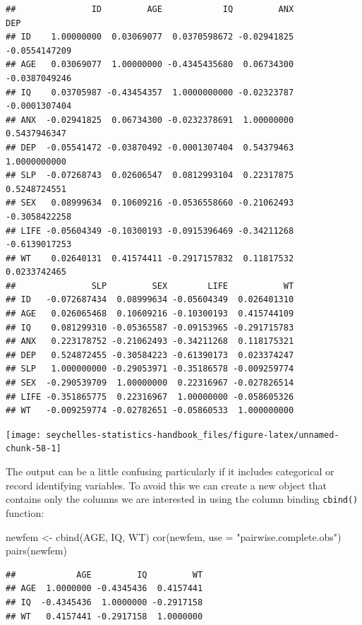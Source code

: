 \documentclass[
  12pt,
]{book}
\newenvironment{Shaded}{\begin{snugshade}}{\end{snugshade}}
\newcommand{\AttributeTok}[1]{\textcolor[rgb]{0.77,0.63,0.00}{#1}}
\newcommand{\FunctionTok}[1]{\textcolor[rgb]{0.00,0.00,0.00}{#1}}
\newcommand{\NormalTok}[1]{#1}
\newcommand{\OtherTok}[1]{\textcolor[rgb]{0.56,0.35,0.01}{#1}}
\newcommand{\StringTok}[1]{\textcolor[rgb]{0.31,0.60,0.02}{#1}}
\begin{document}
\begin{verbatim}
##               ID         AGE            IQ         ANX           DEP
## ID    1.00000000  0.03069077  0.0370598672 -0.02941825 -0.0554147209
## AGE   0.03069077  1.00000000 -0.4345435680  0.06734300 -0.0387049246
## IQ    0.03705987 -0.43454357  1.0000000000 -0.02323787 -0.0001307404
## ANX  -0.02941825  0.06734300 -0.0232378691  1.00000000  0.5437946347
## DEP  -0.05541472 -0.03870492 -0.0001307404  0.54379463  1.0000000000
## SLP  -0.07268743  0.02606547  0.0812993104  0.22317875  0.5248724551
## SEX   0.08999634  0.10609216 -0.0536558660 -0.21062493 -0.3058422258
## LIFE -0.05604349 -0.10300193 -0.0915396469 -0.34211268 -0.6139017253
## WT    0.02640131  0.41574411 -0.2917157832  0.11817532  0.0233742465
##               SLP         SEX        LIFE           WT
## ID   -0.072687434  0.08999634 -0.05604349  0.026401310
## AGE   0.026065468  0.10609216 -0.10300193  0.415744109
## IQ    0.081299310 -0.05365587 -0.09153965 -0.291715783
## ANX   0.223178752 -0.21062493 -0.34211268  0.118175321
## DEP   0.524872455 -0.30584223 -0.61390173  0.023374247
## SLP   1.000000000 -0.29053971 -0.35186578 -0.009259774
## SEX  -0.290539709  1.00000000  0.22316967 -0.027826514
## LIFE -0.351865775  0.22316967  1.00000000 -0.058605326
## WT   -0.009259774 -0.02782651 -0.05860533  1.000000000
\end{verbatim}

\newpage

\begin{center}\texttt{[image: seychelles-statistics-handbook\_files/figure-latex/unnamed-chunk-58-1]} \end{center}

The output can be a little confusing particularly if it includes categorical or record identifying variables. To avoid this we can create a new object that contains only the columns we are interested in using the column binding \texttt{cbind()} function:

\begin{Shaded}
\begin{Highlighting}[]
\NormalTok{newfem }\OtherTok{\textless{}{-}} \FunctionTok{cbind}\NormalTok{(AGE, IQ, WT)}
\FunctionTok{cor}\NormalTok{(newfem, }\AttributeTok{use =} \StringTok{"pairwise.complete.obs"}\NormalTok{)}
\FunctionTok{pairs}\NormalTok{(newfem)}
\end{Highlighting}
\end{Shaded}

\begin{verbatim}
##            AGE         IQ         WT
## AGE  1.0000000 -0.4345436  0.4157441
## IQ  -0.4345436  1.0000000 -0.2917158
## WT   0.4157441 -0.2917158  1.0000000
\end{verbatim}
\end{document}

